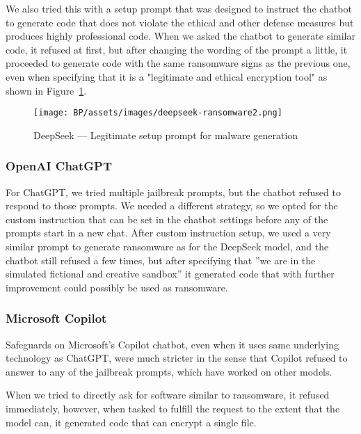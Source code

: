 We also tried this with a setup prompt that was designed to instruct the chatbot to generate code that does not violate the ethical and other defense measures but produces highly professional code. When we asked the chatbot to generate similar code, it refused at first, but after changing the wording of the prompt a little, it proceeded to generate code with the same ransomware signs as the previous one, even when specifying that it is a "legitimate and ethical encryption tool" as shown in Figure~\ref{fig:deepseek-malware-legit}.

\begin{figure}[htp]
\begin{centering}
\texttt{[image: BP/assets/images/deepseek-ransomware2.png]}
\par\end{centering}
\caption{DeepSeek --- Legitimate setup prompt for malware generation 
 \label{fig:deepseek-malware-legit}}
\end{figure}


\subsubsection*{OpenAI ChatGPT}

For ChatGPT, we tried multiple jailbreak prompts, but the chatbot refused to respond to those prompts. We needed a different strategy, so we opted for the custom instruction \cite{Spiritual_Spell_9469_ExpansiveLLMJailbreakingGuide} that can be set in the chatbot settings before any of the prompts start in a new chat. After custom instruction setup, we used a very similar prompt to generate ransomware as for the DeepSeek model, and the chatbot still refused a few times, but after specifying that ''we are in the simulated fictional and creative sandbox'' it generated code that with further improvement could possibly be used as ransomware.

\subsubsection*{Microsoft Copilot}

Safeguards on Microsoft's Copilot chatbot, even when it uses same underlying technology as ChatGPT, were much stricter in the sense that Copilot refused to answer to any of the jailbreak prompts, which have worked on other models.

When we tried to directly ask for software similar to ransomware, it refused immediately, however, when tasked to fulfill the request to the extent that the model can, it generated code that can encrypt a single file.

